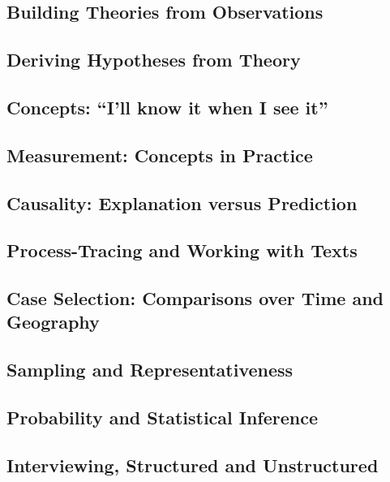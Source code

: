\documentclass[12pt,a4paper]{article}
\begin{document}
\subsection{Building Theories from Observations} %

\subsection{Deriving Hypotheses from Theory} %

\subsection{Concepts: ``I'll know it when I see it''}

\subsection{Measurement: Concepts in Practice}

\subsection{Causality: Explanation versus Prediction}

\subsection{Process-Tracing and Working with Texts}

\subsection{Case Selection: Comparisons over Time and Geography}

\subsection{Sampling and Representativeness}



\subsection{Probability and Statistical Inference}

\subsection{Interviewing, Structured and Unstructured}
\end{document}
